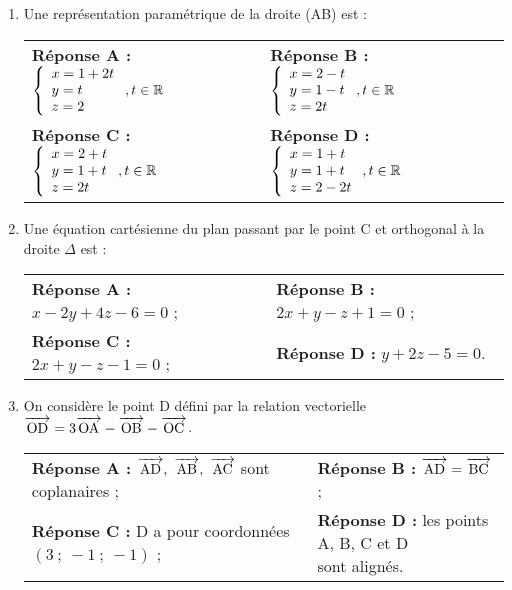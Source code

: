 \documentclass[11pt]{article}
\newcommand{\R}{\mathbb{R}}
\newcommand{\vect}[1]{\overrightarrow{\,\mathstrut#1\,}}
\begin{document}
\begin{enumerate}
\item Une représentation paramétrique de la droite (AB) est :

\begin{center}
\begin{tabularx}{\linewidth}{X X}
\textbf{Réponse A :}$\left\{\begin{array}{l c l}x=1+2t\\y = t\\z = 2\end{array}\right., t \in \R$&
\textbf{Réponse B :} $\left\{\begin{array}{l c l}x =2 - t\\y = 1 - t\\z = 2t\end{array}\right., t \in \R$\\
\textbf{Réponse C :} $\left\{\begin{array}{l c l}x = 2 + t\\y = 1 + t\\z = 2t\end{array}\right., t \in \R$&
\textbf{Réponse D :} $\left\{\begin{array}{l c l}x = 1 + t\\y = 1 + t\\z = 2 - 2t\end{array}\right., t \in \R$
\end{tabularx}
\end{center}


\item Une équation cartésienne du plan passant par le point C et orthogonal à la droite $\Delta$ est :

\begin{center}
\begin{tabularx}{\linewidth}{X X}
\textbf{Réponse A :} $x - 2y + 4z - 6 = 0$ ;& \textbf{Réponse B :} $2x + y - z + 1 = 0$ ;\\
\textbf{Réponse C :} $2x + y - z- 1 = 0$ ;& \textbf{Réponse D :} $y + 2z - 5 = 0$.
\end{tabularx}
\end{center}


\item On considère le point D défini par la relation vectorielle $\vect{\text{OD}} = 3\vect{\text{OA}} - \vect{\text{OB}} - \vect{\text{OC}}$.

\begin{center}
\begin{tabularx}{\linewidth}{X X}
\textbf{Réponse A :} \parbox[t]{4cm}{$\vect{\text{AD}},~ \vect{\text{AB}},~ \vect{\text{AC}}$ sont\\ coplanaires ;} &\textbf{Réponse B :} $\vect{\text{AD}} = \vect{\text{BC}}$ ;\\
\textbf{Réponse C :} \parbox[t]{4cm}{D a pour coordonnées\\ $(3~;~-1~;~-1)$ ;} &\textbf{Réponse D :} \parbox[t]{4cm}{les points A, B, C et D\\ sont alignés.}
\end{tabularx}
\end{center}

\end{enumerate}
\end{document}
